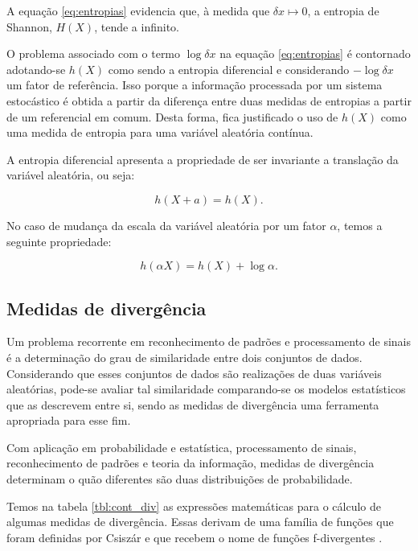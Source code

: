 A equação \ref{eq:entropias} evidencia que, à medida que $\delta x \mapsto 0 $, a entropia de Shannon, $H(X)$, tende a infinito. 

O problema associado com o termo $\log \delta x$ na equação \ref{eq:entropias} é contornado adotando-se $h(X)$ como sendo a entropia diferencial e considerando $-\log \delta x$ um fator de referência. Isso porque a informação processada por um sistema estocástico é obtida a partir da diferença entre duas medidas de entropias a partir de um referencial em comum. Desta forma, fica justificado o uso de $h(X)$ como uma medida de entropia para uma variável aleatória contínua.

A entropia diferencial apresenta a propriedade de ser invariante a translação da variável aleatória, ou seja:

\begin{equation}
h(X+a) = h(X)\text{.}
\end{equation}

No caso de mudança da escala da variável aleatória por um fator $\alpha$, temos a seguinte propriedade:

\begin{equation}\label{eq:escala_entropia}
h(\alpha X) = h(X) + \log{\alpha}\text{.}
\end{equation}

\subsection{Medidas de divergência}

Um problema recorrente em reconhecimento de padrões e processamento de sinais é a determinação do grau de similaridade entre dois conjuntos de dados. Considerando que esses conjuntos de dados são realizações de duas variáveis aleatórias, pode-se avaliar tal similaridade comparando-se os modelos estatísticos que as descrevem entre si, sendo as medidas de divergência uma ferramenta apropriada para esse fim. 

Com aplicação em probabilidade e estatística, processamento de sinais, reconhecimento de padrões e teoria da informação, medidas de divergência determinam o quão diferentes são duas distribuições de probabilidade. 

Temos na tabela \ref{tbl:cont_div} as expressões matemáticas para o cálculo de algumas medidas de divergência. Essas derivam de uma família de funções que foram definidas por Csiszár e que recebem o nome de funções f-divergentes \cite{1999880}. 

